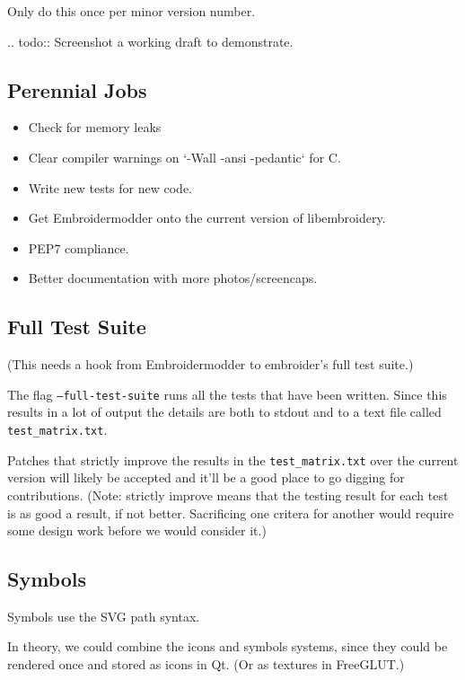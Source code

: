 \documentclass[a4paper]{report}
\begin{document}
Only do this once per minor version number.

.. todo::
   Screenshot a working draft to demonstrate.

\subsection{Perennial Jobs}

\begin{itemize}
\item Check for memory leaks
\item Clear compiler warnings on `-Wall -ansi -pedantic` for C.
\item Write new tests for new code.
\item Get Embroidermodder onto the current version of libembroidery.
\item PEP7 compliance.
\item Better documentation with more photos/screencaps.
\end{itemize}

\subsection{Full Test Suite}

(This needs a hook from Embroidermodder to embroider's full test suite.)

The flag \texttt{--full-test-suite} runs all the tests that have been written.
Since this results in a lot of output the details are both to stdout
and to a text file called \texttt{test\_matrix.txt}.

Patches that strictly improve the results in the \texttt{test\_matrix.txt} over
the current version will likely be accepted and it'll be a good place
to go digging for contributions. (Note: strictly improve means that
the testing result for each test is as good a result, if not better.
Sacrificing one critera for another would require some design work
before we would consider it.)

\subsection{Symbols}

Symbols use the SVG path syntax.

In theory, we could combine the icons and symbols systems, since they could be
rendered once and stored as icons in Qt. (Or as textures in FreeGLUT.)
\end{document}
